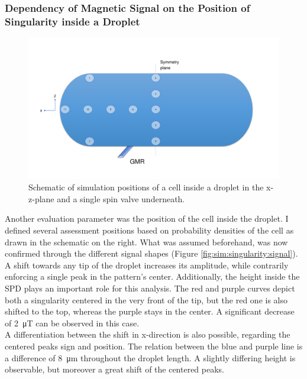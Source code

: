 \subsubsection{Dependency of Magnetic Signal on the Position of Singularity inside a Droplet}
\begin{figure}
	\centering
	\includegraphics[page=1,clip,trim={10mm 30mm 35mm 30mm},width=\linewidth]{Ressourcen/Results/Singularity/Cell_Encapsulation}
	\caption{Schematic of simulation positions of a cell inside a droplet in the x-z-plane and a single spin valve underneath.}
	\label{fig:sim:encapsulation:pos}
\end{figure}
Another evaluation parameter was the position of the cell inside the droplet. I defined several assessment positions based on probability densities of the cell as drawn in the schematic on the right. What was assumed beforehand, was now confirmed through the different signal shapes (Figure \ref{fig:sim:singularity:signal}). \\A shift towards any tip of the droplet increases its amplitude, while contrarily enforcing a single peak in the pattern's center. Additionally, the height inside the SPD plays an important role for this analysis. The red and purple curves depict both a singularity centered in the very front of the tip, but the red one is also shifted to the top, whereas the purple stays in the center. A significant decrease of \SI{2}{\micro\tesla} can be observed in this case.\\
A differentiation between the shift in x-direction is also possible, regarding the centered peaks sign and position. The relation between the blue and purple line is a difference of \SI{8}{\micro\meter} throughout the droplet length. A slightly differing height is observable, but moreover a great shift of the centered peaks.
